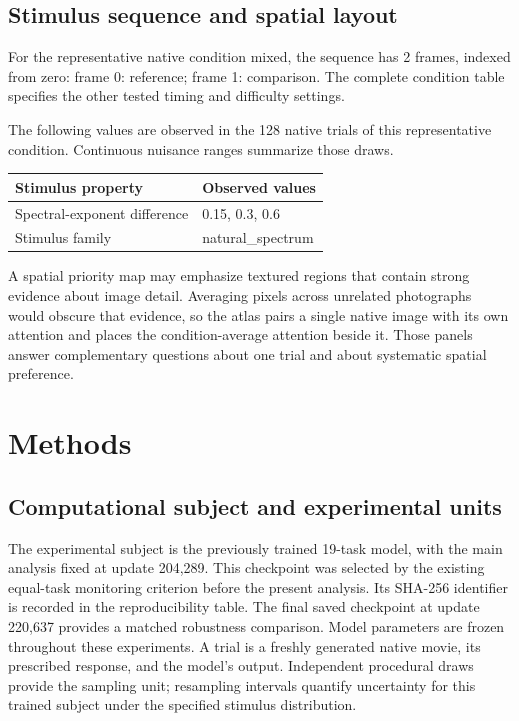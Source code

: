 \documentclass[11pt]{article}
\begin{document}
\subsection{Stimulus sequence and spatial layout}
For the representative native condition mixed, the sequence has 2 frames, indexed from zero: frame 0: reference; frame 1: comparison. The complete condition table specifies the other tested timing and difficulty settings.

The following values are observed in the 128 native trials of this representative condition. Continuous nuisance ranges summarize those draws.
\begin{center}\small\begin{tabular}{p{}p{}}\toprule Stimulus property & Observed values\\\midrule
Spectral-exponent difference & 0.15, 0.3, 0.6\\
Stimulus family & natural\_\allowbreak{}spectrum\\
\bottomrule\end{tabular}\normalsize\end{center}
A spatial priority map may emphasize textured regions that contain strong evidence about image detail. Averaging pixels across unrelated photographs would obscure that evidence, so the atlas pairs a single native image with its own attention and places the condition-average attention beside it. Those panels answer complementary questions about one trial and about systematic spatial preference.


\section{Methods}
\subsection{Computational subject and experimental units}
The experimental subject is the previously trained 19-task model, with the main analysis fixed at update 204,289. This checkpoint was selected by the existing equal-task monitoring criterion before the present analysis. Its SHA-256 identifier is recorded in the reproducibility table. The final saved checkpoint at update 220,637 provides a matched robustness comparison. Model parameters are frozen throughout these experiments. A trial is a freshly generated native movie, its prescribed response, and the model's output. Independent procedural draws provide the sampling unit; resampling intervals quantify uncertainty for this trained subject under the specified stimulus distribution.
\end{document}
